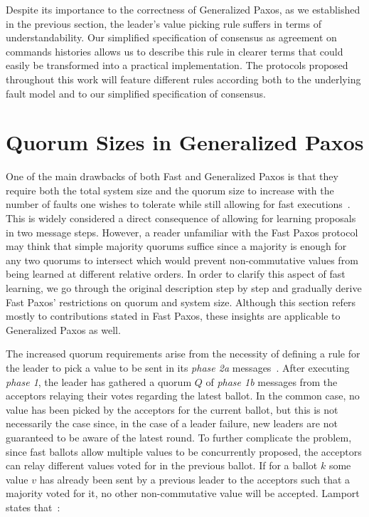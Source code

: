 Despite its importance to the correctness of Generalized Paxos, as we established in the previous section, the leader's value picking rule suffers in terms of understandability. Our simplified specification of consensus as agreement on commands histories allows us to describe this rule in clearer terms that could easily be transformed into a practical implementation. The protocols proposed throughout this work will feature different rules according both to the underlying fault model and to our simplified specification of consensus.

\section{Quorum Sizes in Generalized Paxos} 
One of the main drawbacks of both Fast and Generalized Paxos is that they require both the total system size and the quorum size to increase with the number of faults one wishes to tolerate while still allowing for fast executions~\cite{Lamport2006,Lamport2005}. This is widely considered a direct consequence of allowing for learning proposals in two message steps. However, a reader unfamiliar with the Fast Paxos protocol may think that simple majority quorums suffice since a majority is enough for any two quorums to intersect which would prevent non-commutative values from being learned at different relative orders. In order to clarify this aspect of fast learning, we go through the original description step by step and gradually derive Fast Paxos' restrictions on quorum and system size. Although this section refers mostly to contributions stated in Fast Paxos, these insights are applicable to Generalized Paxos as well.\par
The increased quorum requirements arise from the necessity of defining a rule for the leader to pick a value to be sent in its \textit{phase 2a} messages~\cite{Lamport2006}. After executing \textit{phase 1}, the leader has gathered a quorum $Q$ of \textit{phase 1b} messages from the acceptors relaying their votes regarding the latest ballot. In the common case, no value has been picked by the acceptors for the current ballot, but this is not necessarily the case since, in the case of a leader failure, new leaders are not guaranteed to be aware of the latest round. To further complicate the problem, since fast ballots allow multiple values to be concurrently proposed, the acceptors can relay different values voted for in the previous ballot. If for a ballot $k$ some value $v$ has already been sent by a previous leader to the acceptors such that a majority voted for it, no other non-commutative value will be accepted. Lamport states that~\cite{Lamport2006}:\par

